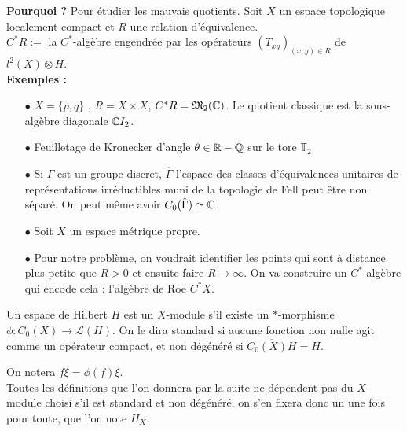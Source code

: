 \documentclass{beamer}
\begin{document}
\begin{frame}
\textbf{Pourquoi ?} 
Pour étudier les mauvais quotients. Soit $X$ un espace topologique localement compact et $R$ une relation d'équivalence.\\
$C^* R :=$ la $C^*$-algèbre engendrée par les opérateurs $(T_{xy})_{(x,y)\in R}$ de $l^2(X)\otimes H$.\\
\textbf{Exemples :}
\begin{itemize}
\item[$\bullet$] $X=\{p,q\}$ , $R=X\times X$, $C^* R = \mathfrak M_2(\mathbb C)$. Le quotient classique est la sous-algèbre diagonale $\mathbb C I_2$.
\item[$\bullet$] Feuilletage de Kronecker d'angle $\theta\in \mathbb R-\mathbb Q$ sur le tore $\mathbb T_2$
\item[$\bullet$] Si $\Gamma$ est un groupe discret, $\hat\Gamma$ l'espace des classes d'équivalences unitaires de représentations irréductibles muni de la topologie de Fell peut être non séparé. On peut même avoir $C_0(\hat \Gamma)\simeq \mathbb C$.
\end{itemize}
\end{frame}

\begin{frame}
\begin{itemize}
\item[$\bullet$] Soit $X$ un espace métrique propre. %
\item[$\bullet$] Pour notre problème, on voudrait identifier les points qui sont à distance plus petite que $R>0$ et ensuite faire $R\rightarrow \infty$. On va construire un $C^*$-algèbre qui encode cela : l'algèbre de Roe $C^* X$.\\
\end{itemize}

\begin{definition}
Un espace de Hilbert $H$ est un $X$-module s'il existe un $*$-morphisme $\phi : C_0(X)\rightarrow \mathcal L(H)$. On le dira standard si aucune fonction non nulle agit comme un opérateur compact, et non dégénéré si $\overline{C_0(X)H}=H$.
\end{definition}
On notera $f\xi= \phi(f)\xi$.\\
Toutes les définitions que l'on donnera par la suite ne dépendent pas du $X$-module choisi s'il est standard et non dégénéré, on s'en fixera donc un une fois pour toute, que l'on note $H_X$.
\end{frame}
\end{document}
